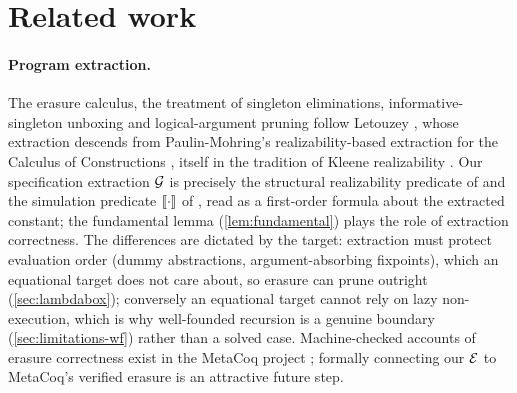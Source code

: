\section{Related work}
\label{sec:related}

\paragraph{Program extraction.}  The erasure calculus, the treatment of
singleton eliminations, informative-singleton unboxing and
logical-argument pruning follow Letouzey
\cite{Letouzey2004,Letouzey2003,Letouzey2008}, whose extraction descends
from Paulin-Mohring's realizability-based extraction for the Calculus of
Constructions \cite{PaulinMohring1989}, itself in the tradition of
Kleene realizability \cite{Kleene1945,TroelstraVanDalen1988}.  Our
specification extraction $\mathcal{G}$ is precisely the structural
realizability predicate of \cite{PaulinMohring1989} and the simulation
predicate $[\![ \cdot ]\!]$ of \cite[\S 2.4]{Letouzey2004}, read as a
first-order formula about the extracted constant; the fundamental lemma
(\cref{lem:fundamental}) plays the role of extraction correctness.  The
differences are dictated by the target: extraction must protect
evaluation order (dummy abstractions, argument-absorbing fixpoints),
which an equational target does not care about, so erasure can prune
outright (\cref{sec:lambdabox}); conversely an equational target cannot
rely on lazy non-execution, which is why well-founded recursion is a
genuine boundary (\cref{sec:limitations-wf}) rather than a solved case.
Machine-checked accounts of erasure correctness exist in the MetaCoq
project \cite{SozeauEtAl2020}; formally connecting our $\mathcal{E}$ to
MetaCoq's verified erasure is an attractive future step.

